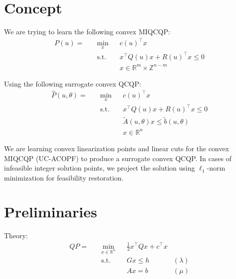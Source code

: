 \documentclass[11pt,twoside]{article}
\begin{document}
\newpage
\section{Concept}

We are trying to learn the following convex MIQCQP:
\begin{equation}
	\begin{aligned}
		P(u) = \quad & \min_{x} & & c(u)^\top x \\
		& \text{s.t.} & & x^\top Q(u) x + R(u)^\top x \leq 0 \\
		&&& x \in \mathbb{R}^m \times \mathbb{Z}^{n-m}	
	\end{aligned}
\end{equation}


Using the following surrogate convex QCQP:
\begin{equation}
	\begin{aligned}
		\hat{P}(u,\theta) = \quad & \min_{x} & & c(u)^\top x \\
		& \text{s.t.} & & x^\top Q(u) x + R(u)^\top x \leq 0 \\
		&&& \tilde{A}(u, \theta) x \leq \tilde{b}(u, \theta) \\
		&&& x \in \mathbb{R}^n
	\end{aligned}
\end{equation}

We are learning convex linearization points and linear cuts for the convex MIQCQP (UC-ACOPF) to produce a surrogate convex QCQP. In cases of infeasible integer solution points, we project the solution using $\ell_1$-norm minimization for feasibility restoration.

\section{Preliminaries}
Theory:
\begin{equation}
	\begin{aligned}
		QP = \quad & \min_{x\in\mathbb{R}^n} & &\frac{1}{2} x^\top Q x + c^\top x \\
		& \text{s.t.} & & Gx \leq h & (\lambda) \\
		&&& Ax = b & (\mu) 
	\end{aligned}
\end{equation}
\end{document}
